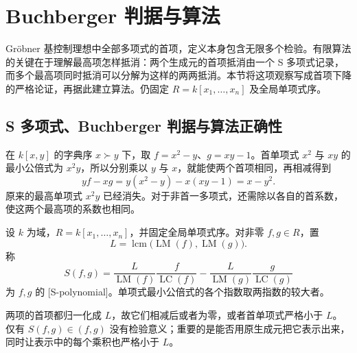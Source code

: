 
\section{Buchberger 判据与算法}
\label{b3:sec:0802}

Gröbner 基控制理想中全部多项式的首项，定义本身包含无限多个检验。有限算法的关键在于理解最高项怎样抵消：两个生成元的首项抵消由一个 S 多项式记录，而多个最高项同时抵消可以分解为这样的两两抵消。本节将这项观察写成首项下降的严格论证，再据此建立算法。仍固定 \(R=k[x_1,\ldots,x_n]\) 及全局单项式序。
\subsection{S 多项式、Buchberger 判据与算法正确性}
\label{b3:subsec:0802:01}

在 \(k[x,y]\) 的字典序 \(x\succ y\) 下，取 \(f=x^2-y\)、\(g=xy-1\)。首单项式 \(x^2\) 与 \(xy\) 的最小公倍式为 \(x^2y\)，所以分别乘以 \(y\) 与 \(x\)，就能使两个首项相同，再相减得到
\[
	yf-xg=y(x^2-y)-x(xy-1)=x-y^2.
\]
原来的最高单项式 \(x^2y\) 已经消失。对于非首一多项式，还需除以各自的首系数，使这两个最高项的系数也相同。

\begin{definition}\label{b3:def:s-polynomial}
	设 \(k\) 为域，\(R=k[x_1,\ldots,x_n]\)，并固定全局单项式序。对非零 \(f,g\in R\)，置
	\[
		L=\operatorname{lcm}\bigl(\operatorname{LM}(f),\operatorname{LM}(g)\bigr).
	\]
	称
	\begin{equation}\label{b3:eq:s-polynomial}
		S(f,g)= \frac{L}{\operatorname{LM}(f)}\frac{f}{\operatorname{LC}(f)} -\frac{L}{\operatorname{LM}(g)}\frac{g}{\operatorname{LC}(g)}
	\end{equation}
	为 \(f,g\) 的 [S-polynomial]。单项式最小公倍式的各个指数取两指数的较大者。
\end{definition}

两项的首项都归一化成 \(L\)，故它们相减后或者为零，或者首单项式严格小于 \(L\)。仅有 \(S(f,g)\in(f,g)\) 没有检验意义；重要的是能否用原生成元把它表示出来，同时让表示中的每个乘积也严格小于 \(L\)。

